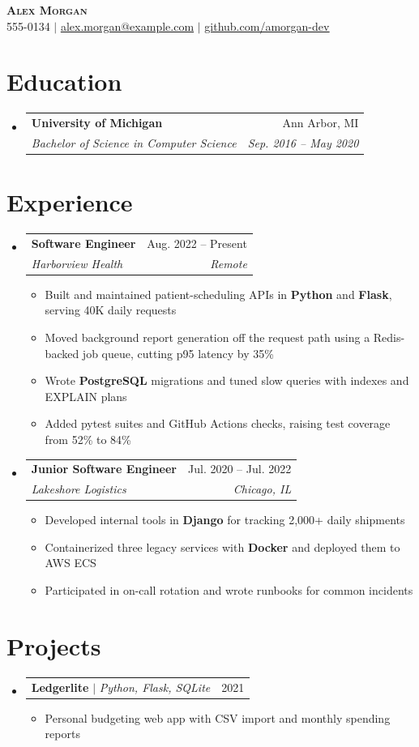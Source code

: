 \documentclass[letterpaper,11pt]{article}
\makeatletter
\newcommand{\resumeItem}[1]{
  \item\small{
    {#1 \vspace{-2pt}}
  }
}
\newcommand{\resumeSubheading}[4]{
  \vspace{-2pt}\item
    \begin{tabular*}{0.97\textwidth}[t]{l@{\extracolsep{\fill}}r}
      \textbf{#1} & #2 \\
      \textit{\small#3} & \textit{\small #4} \\
    \end{tabular*}\vspace{-7pt}
}
\newcommand{\resumeProjectHeading}[2]{
    \item
    \begin{tabular*}{0.97\textwidth}{l@{\extracolsep{\fill}}r}
      \small#1 & #2 \\
    \end{tabular*}\vspace{-7pt}
}
\newcommand{\resumeSubHeadingListStart}{\begin{itemize}[leftmargin=0.15in, label={}]}
\newcommand{\resumeSubHeadingListEnd}{\end{itemize}}
\newcommand{\resumeItemListStart}{\begin{itemize}}
\newcommand{\resumeItemListEnd}{\end{itemize}\vspace{-5pt}}
\makeatother
\begin{document}
\begin{center}
    \textbf{\Huge \scshape Alex Morgan} \\ \vspace{1pt}
    \small 555-0134 $|$ \href{mailto:alex.morgan@example.com}{\underline{alex.morgan@example.com}} $|$
    \href{https://github.com/amorgan-dev}{\underline{github.com/amorgan-dev}}
\end{center}

\section{Education}
  \resumeSubHeadingListStart
    \resumeSubheading
      {University of Michigan}{Ann Arbor, MI}
      {Bachelor of Science in Computer Science}{Sep. 2016 -- May 2020}
  \resumeSubHeadingListEnd

\section{Experience}
  \resumeSubHeadingListStart

    \resumeSubheading
      {Software Engineer}{Aug. 2022 -- Present}
      {Harborview Health}{Remote}
      \resumeItemListStart
        \resumeItem{Built and maintained patient-scheduling APIs in \textbf{Python} and \textbf{Flask}, serving 40K daily requests}
        \resumeItem{Moved background report generation off the request path using a Redis-backed job queue, cutting p95 latency by 35\%}
        \resumeItem{Wrote \textbf{PostgreSQL} migrations and tuned slow queries with indexes and EXPLAIN plans}
        \resumeItem{Added pytest suites and GitHub Actions checks, raising test coverage from 52\% to 84\%}
      \resumeItemListEnd

    \resumeSubheading
      {Junior Software Engineer}{Jul. 2020 -- Jul. 2022}
      {Lakeshore Logistics}{Chicago, IL}
      \resumeItemListStart
        \resumeItem{Developed internal tools in \textbf{Django} for tracking 2,000+ daily shipments}
        \resumeItem{Containerized three legacy services with \textbf{Docker} and deployed them to AWS ECS}
        \resumeItem{Participated in on-call rotation and wrote runbooks for common incidents}
      \resumeItemListEnd

  \resumeSubHeadingListEnd

\section{Projects}
    \resumeSubHeadingListStart
      \resumeProjectHeading
          {\textbf{Ledgerlite} $|$ \emph{Python, Flask, SQLite}}{2021}
          \resumeItemListStart
            \resumeItem{Personal budgeting web app with CSV import and monthly spending reports}
          \resumeItemListEnd
    \resumeSubHeadingListEnd
\end{document}
